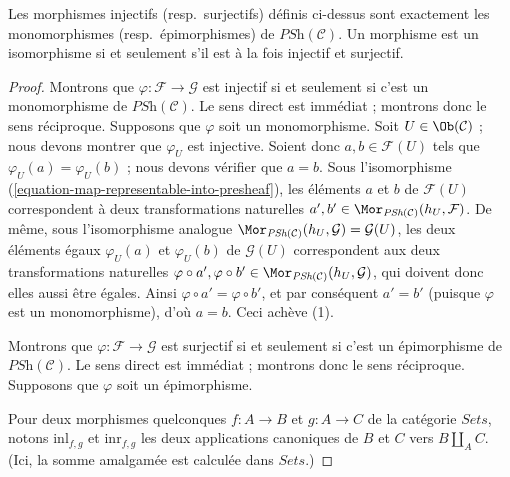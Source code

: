 \begin{lemma}
\label{lemma-mono-epi}
Les morphismes injectifs (resp.\ surjectifs) définis ci-dessus
sont exactement les monomorphismes (resp.\ épimorphismes) de
$\textit{PSh}(\mathcal{C})$. Un morphisme est un isomorphisme
si et seulement s’il est à la fois injectif et surjectif.
\end{lemma}

\begin{proof}
Montrons que $\varphi : \mathcal{F} \to
\mathcal{G}$ est injectif si et seulement si c’est un monomorphisme
de $\textit{PSh}(\mathcal{C})$. Le sens direct
est immédiat ; montrons donc le sens réciproque.
Supposons que $\varphi$ soit un monomorphisme. Soit
$U \in \Ob(\mathcal{C})$ ; nous devons montrer que $\varphi_U$ est
injective. Soient donc $a, b \in \mathcal{F}(U)$ tels que
$\varphi_U (a) = \varphi_U (b)$ ; nous devons vérifier que $a = b$.
Sous l’isomorphisme
(\ref{equation-map-representable-into-presheaf}), les éléments
$a$ et $b$ de $\mathcal{F}(U)$ correspondent à deux transformations
naturelles
$a', b' \in \Mor_{\textit{PSh}(\mathcal{C})}(h_U, \mathcal{F})$.
De même, sous l’isomorphisme analogue
$\Mor_{\textit{PSh}(\mathcal{C})}(h_U, \mathcal{G})
= \mathcal{G}(U)$,
les deux éléments égaux $\varphi_U (a)$ et $\varphi_U (b)$ de
$\mathcal{G}(U)$ correspondent aux deux transformations naturelles
$\varphi \circ a', \varphi \circ b'
\in \Mor_{\textit{PSh}(\mathcal{C})}(h_U, \mathcal{G})$,
qui doivent donc elles aussi être égales. Ainsi
$\varphi \circ a' = \varphi \circ b'$, et par conséquent $a' = b'$
(puisque $\varphi$ est un monomorphisme), d’où $a = b$. Ceci achève (1).

\medskip\noindent
Montrons que $\varphi : \mathcal{F} \to
\mathcal{G}$ est surjectif si et seulement si c’est un épimorphisme
de $\textit{PSh}(\mathcal{C})$. Le sens direct
est immédiat ; montrons donc le sens réciproque.
Supposons que $\varphi$ soit un épimorphisme.

\medskip\noindent
Pour deux morphismes quelconques $f : A \to B$ et $g : A \to C$ de la
catégorie $\textit{Sets}$, notons $\text{inl}_{f,g}$ et
$\text{inr}_{f,g}$ les deux applications canoniques de
$B$ et $C$ vers $B \coprod_A C$. (Ici, la somme amalgamée est
calculée dans $\textit{Sets}$.)


\end{proof}
